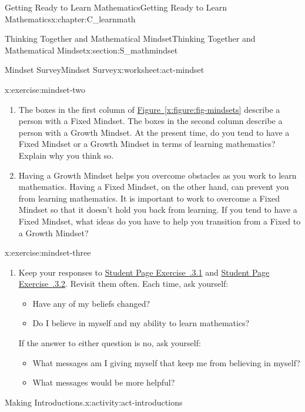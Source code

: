 \documentclass[oneside,10pt,]{book}
\newcommand{\xreffont}{\relax}
\numberwithin{equation}{chapter}
\begin{document}
\begin{chapterptx}{Getting Ready to Learn Mathematics}{}{Getting Ready to Learn Mathematics}{}{}{x:chapter:C_learnmath}
\begin{sectionptx}{Thinking Together and Mathematical Mindset}{}{Thinking Together and Mathematical Mindset}{}{}{x:section:S_mathmindset}
\begin{worksheet-subsection}{Mindset Survey}{}{Mindset Survey}{}{}{x:worksheet:act-mindset}
\begin{divisionexercise}{2}{}{}{x:exercise:mindset-two}
\begin{enumerate}[font=\bfseries,label=(\alph*),ref=\alph*]
\item{}The boxes in the first column of \hyperref[x:figure:fig-mindsets]{Figure~{\xreffont\ref{x:figure:fig-mindsets}}} describe a person with a Fixed Mindset. The boxes in the second column describe a person with a Growth Mindset. At the present time, do you tend to have a Fixed Mindset or a Growth Mindset in terms of learning mathematics? Explain why you think so.%
\item{}Having a Growth Mindset helps you overcome obstacles as you work to learn mathematics. Having a Fixed Mindset, on the other hand, can prevent you from learning mathematics. It is important to work to overcome a Fixed Mindset so that it doesn't hold you back from learning. If you tend to have a Fixed Mindset, what ideas do you have to help you transition from a Fixed to a Growth Mindset?%
\end{enumerate}
\end{divisionexercise}%
\begin{divisionexercise}{3}{}{}{x:exercise:mindset-three}%
\begin{enumerate}[font=\bfseries,label=(\alph*),ref=\alph*]
\item{}Keep your responses to \hyperlink{x:exercise:mindset-one}{Student Page Exercise~{\xreffont 1.2.3.1}} and \hyperlink{x:exercise:mindset-two}{Student Page Exercise~{\xreffont 1.2.3.2}}. Revisit them often. Each time, ask yourself:%
\begin{itemize}[label=\textbullet]
\item{}Have any of my beliefs changed?%
\item{}Do I believe in myself and my ability to learn mathematics?%
\end{itemize}
If the answer to either question is no, ask yourself:%
\begin{itemize}[label=\textbullet]
\item{}What messages am I giving myself that keep me from believing in myself?%
\item{}What messages would be more helpful?%
\end{itemize}
%
\end{enumerate}
\end{divisionexercise}%
\end{worksheet-subsection}
\restoregeometry
\begin{activity}{Making Introductions.}{x:activity:act-introductions}%

\end{activity}
\end{sectionptx}
\end{chapterptx}
\end{document}
